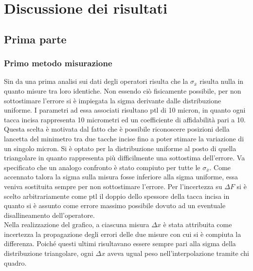 \documentclass[a4paper,11pt,oneside]{article}
\begin{document}

\newpage

\section{Discussione dei risultati}

\subsection{Prima parte}
\subsubsection*{Primo metodo misurazione}
Sin da una prima analisi sui dati degli operatori risulta che la $\sigma_{\overline{x}}$ risulta nulla in quanto misure tra loro identiche. Non essendo ciò fisicamente possibile, per non sottostimare l'errore si è impiegata la sigma derivante dalle distribuzione uniforme. I parametri ad essa associati risultano ptl di 10 micron, in quanto ogni tacca incisa rappresenta 10 micrometri ed un coefficiente di affidabilità pari a 10. Questa scelta è motivata dal fatto che è possibile riconoscere posizioni della lancetta del minimetro tra due tacche incise fino a poter stimare la variazione di un singolo micron. Si è optato per la distribuzione uniforme al posto di quella triangolare in quanto rappresenta più difficilmente una sottostima dell'errore.
Va specificato che un analogo confronto è stato compiuto per tutte le $\sigma_{\overline{x}}$. Come accennato talora la sigma sulla misura fosse inferiore alla sigma uniforme, essa veniva sostituita sempre per non sottostimare l'errore. Per l'incertezza su $\Delta F$ si è scelto arbitrariamente come ptl il doppio dello spessore della tacca incisa in quanto si è assunto come errore massimo possibile dovuto ad un eventuale disallineamento dell'operatore.\\
Nella realizzazione del grafico, a ciascuna misura $\Delta x$ è stata attribuita come incertezza la propagazione degli errori delle due misure con cui si è compiuta la differenza. Poiché questi ultimi risultavano essere sempre pari alla sigma della distribuzione triangolare, ogni $\Delta x$ aveva ugual peso nell'interpolazione tramite chi quadro.\\
\end{document}
